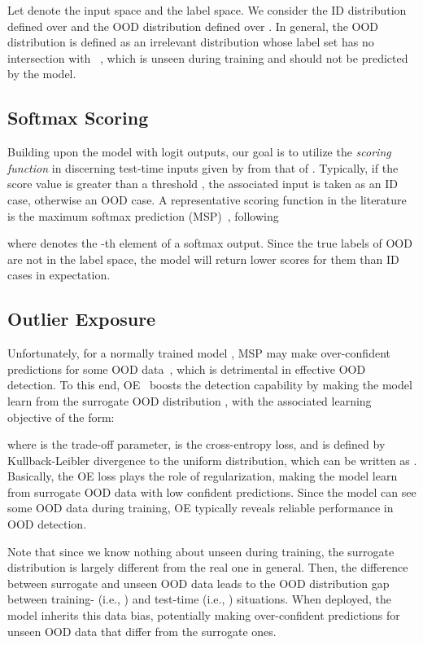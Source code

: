 \documentclass{article} \usepackage{iclr2022_conference,times}
\begin{document}
Let  denote the input space and  the label space. We consider the ID distribution  defined over  and the OOD distribution  defined over . In general, the OOD distribution  is defined as an irrelevant distribution whose label set has no intersection with ~\citep{yang2021generalized}, which is unseen during training and should not be predicted by the model. 



\subsection{Softmax Scoring}

Building upon the model  with logit outputs, our goal is to utilize the \emph{scoring function}  in discerning test-time inputs given by  from that of . Typically, if the score value  is greater than a threshold , the associated input  is taken as an ID case, otherwise an OOD case. A representative scoring function in the literature is the maximum softmax prediction (MSP)~\citep{hendrycks2016baseline}, following

where  denotes the -th element of a softmax output. Since the true labels of OOD are not in the label space, the model will return lower scores for them than ID cases in expectation. 

\subsection{Outlier Exposure}

Unfortunately, for a normally trained model , MSP may make over-confident predictions for some OOD data~\citep{liu2020energy}, which is detrimental in effective OOD detection. To this end, OE~\citep{HendrycksMD19} boosts the detection capability by making the model  learn from the surrogate OOD distribution , with the associated learning objective of the form:

where  is the trade-off parameter,   is the cross-entropy loss, and  is defined by Kullback-Leibler divergence to the uniform distribution, which can be written as . Basically, the OE loss  plays the role of regularization, making the model learn from surrogate OOD data with low confident predictions. Since the model can see some OOD data during training, OE typically reveals reliable performance in OOD detection. 

Note that since we know nothing about unseen during training, the surrogate distribution  is largely different from the real one  in general. Then, the difference between surrogate and unseen OOD data leads to the OOD distribution gap between training- (i.e., ) and test-time (i.e., ) situations. When deployed, the model inherits this data bias, potentially making over-confident predictions for unseen OOD data that differ from the surrogate ones. 
\end{document}
